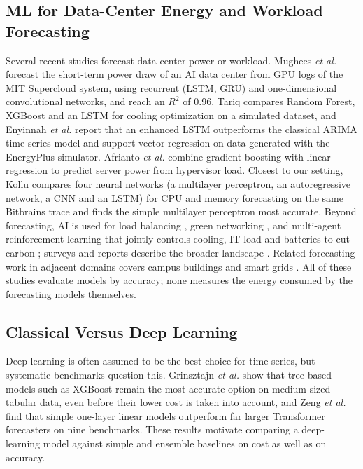\documentclass[conference,letterpaper,10pt]{IEEEtran}
\begin{document}
\subsection{ML for Data-Center Energy and Workload Forecasting}
Several recent studies forecast data-center power or workload. Mughees \textit{et al.} \cite{mughees2025stlf} forecast the short-term power draw of an AI data center from GPU logs of the MIT Supercloud system, using recurrent (LSTM, GRU) and one-dimensional convolutional networks, and reach an $R^2$ of 0.96. Tariq \cite{tariq2025nextgen} compares Random Forest, XGBoost and an LSTM for cooling optimization on a simulated dataset, and Enyinnah \textit{et al.} \cite{enyinnah2022lstm} report that an enhanced LSTM outperforms the classical ARIMA time-series model and support vector regression on data generated with the EnergyPlus simulator. Afrianto \textit{et al.} \cite{afrianto2025yugo} combine gradient boosting with linear regression to predict server power from hypervisor load. Closest to our setting, Kollu \cite{kollu2024comparative} compares four neural networks (a multilayer perceptron, an autoregressive network, a CNN and an LSTM) for CPU and memory forecasting on the same Bitbrains trace and finds the simple multilayer perceptron most accurate. Beyond forecasting, AI is used for load balancing \cite{janardhanan2024load}, green networking \cite{ebadinezhad2025green}, and multi-agent reinforcement learning that jointly controls cooling, IT load and batteries to cut carbon \cite{sarkar2024carbon}; surveys and reports describe the broader landscape \cite{panwar2024ml,epri2024powering,ifri2025ai,huang2026aidc}. Related forecasting work in adjacent domains covers campus buildings \cite{fathi2020campus} and smart grids \cite{aljarrah2024smartgrid}. All of these studies evaluate models by accuracy; none measures the energy consumed by the forecasting models themselves.

\subsection{Classical Versus Deep Learning}
Deep learning is often assumed to be the best choice for time series, but systematic benchmarks question this. Grinsztajn \textit{et al.} \cite{grinsztajn2022tree} show that tree-based models such as XGBoost remain the most accurate option on medium-sized tabular data, even before their lower cost is taken into account, and Zeng \textit{et al.} \cite{zeng2023transformers} find that simple one-layer linear models outperform far larger Transformer forecasters on nine benchmarks. These results motivate comparing a deep-learning model against simple and ensemble baselines on cost as well as on accuracy.
\end{document}
